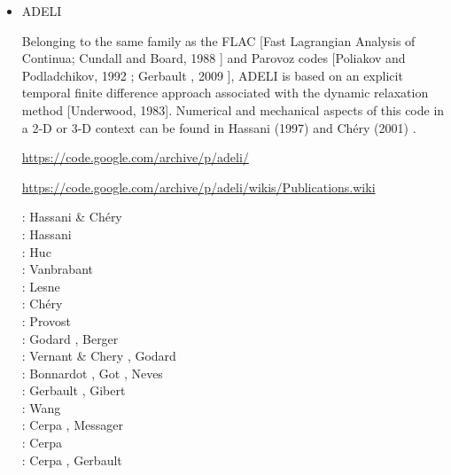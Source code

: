 \begin{itemize}
\cite{nehe06}
\cite{guyr16}

\item {\codefont ADELI} 

Belonging to the same family as the FLAC [Fast Lagrangian Analysis of Continua; Cundall and Board, 
1988 \cite{cubo88}] and Parovoz codes [Poliakov and Podladchikov, 1992 \cite{popo92}; 
Gerbault \etal, 2009 \cite{gecm09}], ADELI is based on an explicit temporal
finite difference approach associated with the dynamic relaxation method [Underwood, 1983]. 
Numerical and mechanical aspects of this code in a 2-D or 3-D context can be 
found in Hassani \etal (1997) \cite{hajc97} and Ch\'ery \etal (2001) \cite{chzh01}.

\url{https://code.google.com/archive/p/adeli/}

\url{https://code.google.com/archive/p/adeli/wikis/Publications.wiki}

\begin{scriptsize}
\noindent
\nineteenninetysix: Hassani \& Ch\'ery \cite{hach96b}\\
\nineteenninetyseven: Hassani \etal\cite{hajc97}\\
\nineteenninetyeight: Huc \etal \cite{huhc98}\\
\nineteenninetynine: Vanbrabant \etal \cite{vajh99}\\
\twothousand: Lesne \etal \cite{lecd00}\\
\twothousandone: Ch\'ery \etal \cite{chzh01}\\
\twothousandthree: Provost \etal \cite{prch03}\\
\twothousandfour: Godard \etal \cite{gocl04}, Berger \etal \cite{bejh04}\\
\twothousandsix: Vernant \& Chery \cite{vech06}, Godard \etal \cite{golc06}\\
\twothousandeight: Bonnardot \etal \cite{boht08a,boht08b}, Got \etal \cite{gomm08},
                   Neves \etal \cite{netv08}\\
\twothousandtwelve: Gerbault \etal \cite{gech12}, Gibert \etal \cite{gigh12}\\
\twothousandthirteen: Wang \etal \cite{wahd13}\\
\twothousandfourteen: Cerpa \etal \cite{cehg14}, Messager \etal \cite{mehn14}\\
\twothousandfifteen: Cerpa \etal \cite{ceag15}\\
\twothousandeighteen: Cerpa \etal \cite{cegm18}, Gerbault \etal \cite{gehn18}
\end{scriptsize}


\end{itemize}
